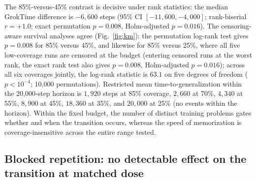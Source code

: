 \documentclass[10pt]{article}
\newcommand{\groktime}{GrokTime}
\begin{document}
The 85\%-versus-45\% contrast is decisive under rank statistics: the median \groktime{} difference is $-6{,}600$ steps (95\% CI $[-11{,}600, -4{,}000]$; rank-biserial $r=+1.0$; exact permutation $p=0.008$, Holm-adjusted $p=0.016$). The censoring-aware survival analyses agree (Fig.~\ref{fig:km}): the permutation log-rank test gives $p=0.008$ for 85\% versus 45\%, and likewise for 85\% versus 25\%, where all five low-coverage runs are censored at the budget (entering censored runs at the worst rank, the exact rank test also gives $p=0.008$, Holm-adjusted $p=0.016$); across all six coverages jointly, the log-rank statistic is $63.1$ on five degrees of freedom ($p < 10^{-4}$; 10{,}000 permutations). Restricted mean time-to-generalization within the 20{,}000-step horizon is $1{,}920$ steps at 85\% coverage, $2{,}660$ at 70\%, $4{,}340$ at 55\%, $8{,}900$ at 45\%, $18{,}360$ at 35\%, and $20{,}000$ at 25\% (no events within the horizon). Within the fixed budget, the number of distinct training problems gates whether and when the transition occurs, whereas the speed of memorization is coverage-insensitive across the entire range tested.

\subsection{Blocked repetition: no detectable effect on the transition at matched dose}
\label{sec:blocked}
\end{document}
